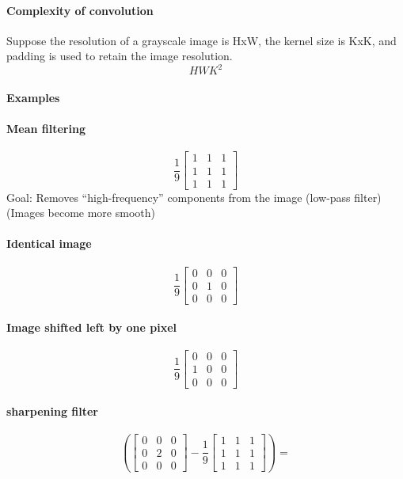 \paragraph*{Complexity of convolution}
Suppose the resolution of a grayscale image is HxW, the kernel size is KxK, and
padding is used to retain the image resolution.
\[HWK^2\]


\paragraph*{Examples}
\paragraph*{Mean filtering}

\[
    \frac{1}{9}
    \begin{bmatrix}
        1 & 1 & 1 \\
        1 & 1 & 1 \\
        1 & 1 & 1
    \end{bmatrix}
\]
Goal: Removes “high-frequency” components from the
image (low-pass filter) (Images become more smooth)


\paragraph*{Identical image}
\[
    \frac{1}{9}
    \begin{bmatrix}
        0 & 0 & 0 \\
        0 & 1 & 0 \\
        0 & 0 & 0
    \end{bmatrix}
\]


\paragraph*{Image shifted left by one pixel}
\[
    \frac{1}{9}
    \begin{bmatrix}
        0 & 0 & 0 \\
        1 & 0 & 0 \\
        0 & 0 & 0
    \end{bmatrix}
\]


\paragraph*{sharpening filter}
\[
    \left(
    \begin{bmatrix}
        0 & 0 & 0 \\
        0 & 2 & 0 \\
        0 & 0 & 0
    \end{bmatrix}
    -
    \frac{1}{9}
    \begin{bmatrix}
        1 & 1 & 1 \\
        1 & 1 & 1 \\
        1 & 1 & 1
    \end{bmatrix}
    \right)
    =
\]


